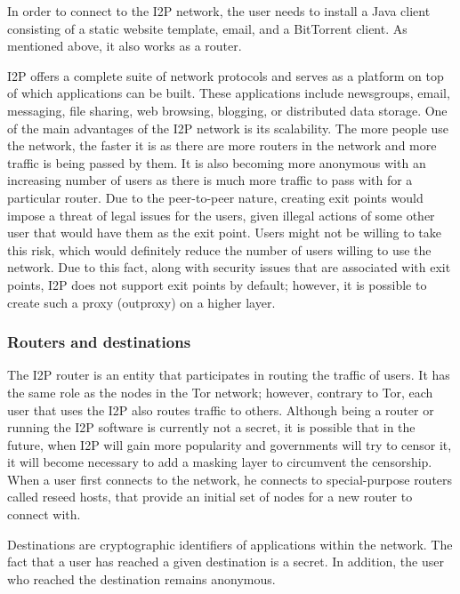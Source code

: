 In order to connect to the I2P network, the user needs to install a Java client consisting of a static website template, email, and a BitTorrent client. As mentioned above, it also works as a router.

I2P offers a complete suite of network protocols and serves as a platform on top of which applications can be built. These applications include newsgroups, email, messaging, file sharing, web browsing, blogging, or distributed data storage.
One of the main advantages of the I2P network is its scalability. The more people use the network, the faster it is as there are more routers in the network and more traffic is being passed by them. It is also becoming more anonymous with an increasing number of users as there is much more traffic to pass with for a particular router. Due to the peer-to-peer nature, creating exit points would impose a threat of legal issues for the users, given illegal actions of some other user that would have them as the exit point. Users might not be willing to take this risk, which would definitely reduce the number of users willing to use the network. Due to this fact, along with security issues that are associated with exit points, I2P does not support exit points by default; however, it is possible to create such a proxy (outproxy) on a higher layer.

\subsubsection{Routers and destinations}
The I2P router is an entity that participates in routing the traffic of users. It has the same role as the nodes in the Tor network; however, contrary to Tor, each user that uses the I2P also routes traffic to others. Although being a router or running the I2P software is currently not a secret, it is possible that in the future, when I2P will gain more popularity and governments will try to censor it, it will become necessary to add a masking layer to circumvent the censorship. When a user first connects to the network, he connects to special-purpose routers called reseed hosts, that provide an initial set of nodes for a new router to connect with.

Destinations are cryptographic identifiers of applications within the network. The fact that a user has reached a given destination is a secret. In addition, the user who reached the destination remains anonymous.

